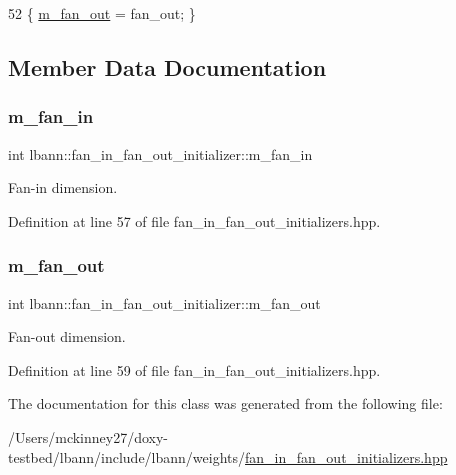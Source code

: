 \begin{DoxyCode}
52 \{ \hyperlink{classlbann_1_1fan__in__fan__out__initializer_ac67d275ab8574780525d2af59b738338}{m\_fan\_out} = fan\_out; \}
\end{DoxyCode}


\subsection{Member Data Documentation}
\mbox{\label{classlbann_1_1fan__in__fan__out__initializer_aea6639db271d9050f0a2e4f8c8dfa6cd}} 
\subsubsection{\texorpdfstring{m\+\_\+fan\+\_\+in}{m\_fan\_in}}
{\footnotesize\ttfamily int lbann\+::fan\+\_\+in\+\_\+fan\+\_\+out\+\_\+initializer\+::m\+\_\+fan\+\_\+in\hspace{0.3cm}{\ttfamily [protected]}}

Fan-\/in dimension. 

Definition at line 57 of file fan\+\_\+in\+\_\+fan\+\_\+out\+\_\+initializers.\+hpp.

\mbox{\label{classlbann_1_1fan__in__fan__out__initializer_ac67d275ab8574780525d2af59b738338}} 
\subsubsection{\texorpdfstring{m\+\_\+fan\+\_\+out}{m\_fan\_out}}
{\footnotesize\ttfamily int lbann\+::fan\+\_\+in\+\_\+fan\+\_\+out\+\_\+initializer\+::m\+\_\+fan\+\_\+out\hspace{0.3cm}{\ttfamily [protected]}}

Fan-\/out dimension. 

Definition at line 59 of file fan\+\_\+in\+\_\+fan\+\_\+out\+\_\+initializers.\+hpp.



The documentation for this class was generated from the following file\+:\begin{DoxyCompactItemize}
\item 
/\+Users/mckinney27/doxy-\/testbed/lbann/include/lbann/weights/\hyperlink{fan__in__fan__out__initializers_8hpp}{fan\+\_\+in\+\_\+fan\+\_\+out\+\_\+initializers.\+hpp}\end{DoxyCompactItemize}
